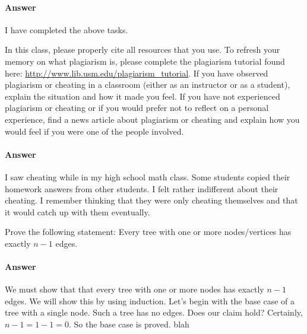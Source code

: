 \documentclass{article}
\begin{document}
\paragraph{Answer}


I have completed the above tasks.



\nextprob
\collab{}

    In this class,
    please properly cite all resources that you use.
    To refresh your memory on what plagiarism is,
    please
    complete the plagiarism tutorial found here:
    \url{http://www.lib.usm.edu/plagiarism_tutorial}.
    If you have observed plagiarism or cheating in a classroom (either as an
    instructor or as a student), explain the situation and how it made you
    feel.  If you have not experienced plagiarism or cheating or if you would
    prefer not to reflect on a personal experience, find a news
    article about plagiarism or cheating and explain how you would feel if you
    were one of the people involved.

\paragraph{Answer}


I saw cheating while in my high school math class.
Some students copied their homework answers from other students.
I felt rather indifferent about their cheating.
I remember thinking that they were only cheating themselves and that it would catch up with them eventually.




\nextprob
Prove the following statement: Every tree with one or more nodes/vertices has
exactly $n-1$ edges.

\paragraph{Answer}


We must show that that every tree with one or more nodes has exactly $n-1$ edges.
We will show this by using induction. \parspace
Let's begin with the base case of a tree with a single node.
Such a tree has no edges.
Does our claim hold?
Certainly, $n-1 = 1-1 = 0$.
So the base case is proved. \parspace
blah
\end{document}
